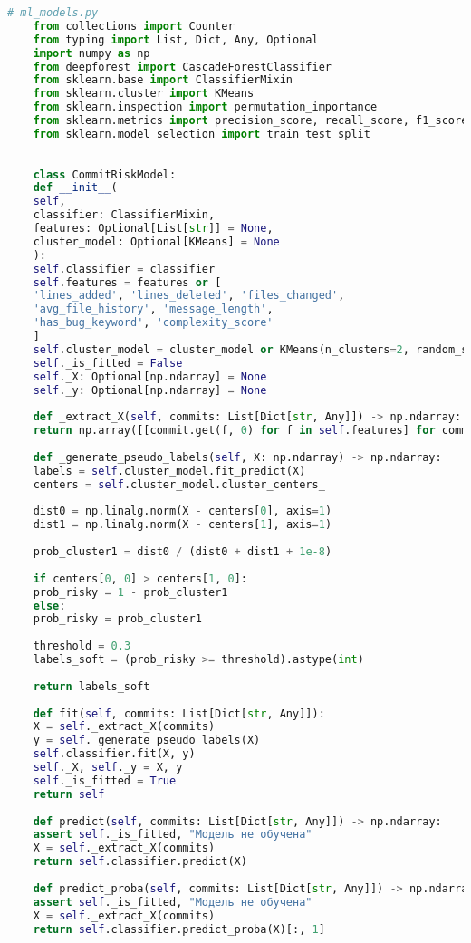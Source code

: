 \begin{lstlisting}[language=Python, caption={{ \texttt{ml\_model.py}}}]
	# ml_models.py
	from collections import Counter
	from typing import List, Dict, Any, Optional
	import numpy as np
	from deepforest import CascadeForestClassifier
	from sklearn.base import ClassifierMixin
	from sklearn.cluster import KMeans
	from sklearn.inspection import permutation_importance
	from sklearn.metrics import precision_score, recall_score, f1_score, roc_auc_score
	from sklearn.model_selection import train_test_split
	
	
	class CommitRiskModel:
	def __init__(
	self,
	classifier: ClassifierMixin,
	features: Optional[List[str]] = None,
	cluster_model: Optional[KMeans] = None
	):
	self.classifier = classifier
	self.features = features or [
	'lines_added', 'lines_deleted', 'files_changed',
	'avg_file_history', 'message_length',
	'has_bug_keyword', 'complexity_score'
	]
	self.cluster_model = cluster_model or KMeans(n_clusters=2, random_state=0, n_init=10)
	self._is_fitted = False
	self._X: Optional[np.ndarray] = None
	self._y: Optional[np.ndarray] = None
	
	def _extract_X(self, commits: List[Dict[str, Any]]) -> np.ndarray:
	return np.array([[commit.get(f, 0) for f in self.features] for commit in commits])
	
	def _generate_pseudo_labels(self, X: np.ndarray) -> np.ndarray:
	labels = self.cluster_model.fit_predict(X)
	centers = self.cluster_model.cluster_centers_
	
	dist0 = np.linalg.norm(X - centers[0], axis=1)
	dist1 = np.linalg.norm(X - centers[1], axis=1)
	
	prob_cluster1 = dist0 / (dist0 + dist1 + 1e-8)
	
	if centers[0, 0] > centers[1, 0]:
	prob_risky = 1 - prob_cluster1
	else:
	prob_risky = prob_cluster1
	
	threshold = 0.3
	labels_soft = (prob_risky >= threshold).astype(int)
	
	return labels_soft
	
	def fit(self, commits: List[Dict[str, Any]]):
	X = self._extract_X(commits)
	y = self._generate_pseudo_labels(X)
	self.classifier.fit(X, y)
	self._X, self._y = X, y
	self._is_fitted = True
	return self
	
	def predict(self, commits: List[Dict[str, Any]]) -> np.ndarray:
	assert self._is_fitted, "Модель не обучена"
	X = self._extract_X(commits)
	return self.classifier.predict(X)
	
	def predict_proba(self, commits: List[Dict[str, Any]]) -> np.ndarray:
	assert self._is_fitted, "Модель не обучена"
	X = self._extract_X(commits)
	return self.classifier.predict_proba(X)[:, 1]
	

\end{lstlisting}
